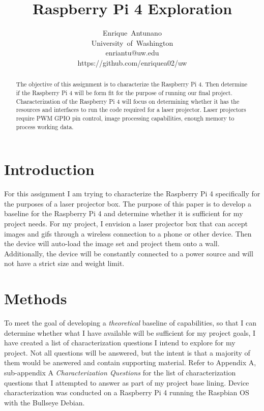 \documentclass[journal]{IEEEtran}
\begin{document}
    \title{Raspberry Pi 4 Exploration}

    \author{Enrique~Antunano\\University~of~Washington\\enriantu@uw.edu\\https://github.com/enriquea02/uw}


    \maketitle

    \begin{abstract}
      The objective of this assignment is to characterize the Raspberry Pi 4. 
      Then determine if the Raspberry Pi 4 will be form fit for the purpose of running our final project.
      Characterization of the Raspberry Pi 4 will focus on determining whether it has the resources and interfaces to run the code required for a laser projector.
      Laser projectors require PWM GPIO pin control, image processing capabilities, enough memory to process working data. 
    \end{abstract}
    \section{Introduction}

    For this assignment I am trying to characterize the Raspberry Pi 4 specifically for the purposes of a laser projector box. 
    The purpose of this paper is to develop a baseline for the Raspberry Pi 4 and determine whether it is sufficient for my project needs.
    For my project, I envision a laser projector box that can accept images and gifs through a wireless connection to a phone or other device. 
    Then the device will auto-load the image set and project them onto a wall. 
    Additionally, the device will be constantly connected to a power source and will not have a strict size and weight limit.

    \section{Methods}
    To meet the goal of developing a \emph{theoretical} baseline of capabilities, so that I can determine whether what I have available will be sufficient for my project goals, 
    I have created a list of characterization questions I intend to explore for my project.
    Not all questions will be answered, but the intent is that a majority of them would be answered and contain supporting material.
    Refer to Appendix A, sub-appendix A \emph{Characterization Questions} for the list of characterization questions that I attempted to answer as part of my project base lining.
    Device characterization was conducted on a Raspberry Pi 4 running the Raspbian OS with the Bullseye Debian.
\end{document}
